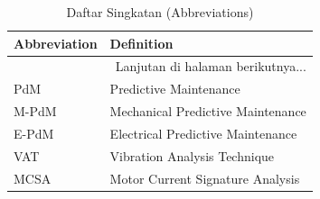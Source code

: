 \documentclass{elsinta}
\begin{document}
\begin{longtable}{|p{4cm}|p{11cm}|} %
    \caption{Daftar Singkatan (Abbreviations)} \label{tab:abbreviationsEL1} \\
    \hline
    \textbf{Abbreviation} & \textbf{Definition} \\
    \hline
    \endhead %
    
    \hline 
    \multicolumn{2}{|r|}{Lanjutan di halaman berikutnya...} \\ 
    \endfoot %
    
    \hline
    \endlastfoot %

    PdM & Predictive Maintenance \\
    \hline
    M-PdM & Mechanical Predictive Maintenance \\
    \hline
    E-PdM & Electrical Predictive Maintenance \\
    \hline
    VAT & Vibration Analysis Technique \\
    \hline
    MCSA & Motor Current Signature Analysis \\
    \hline    

\end{longtable}

\end{document}
